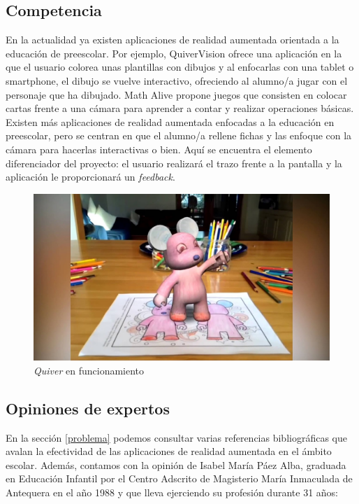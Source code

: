 \documentclass[12pt,spanish]{article}
\begin{document}
\subsection{Competencia}

En la actualidad ya existen aplicaciones de realidad aumentada orientada a la educación de preescolar. Por ejemplo, QuiverVision \cite{quiver} ofrece una aplicación en la que el usuario colorea unas plantillas con dibujos y al enfocarlas con una tablet o smartphone, el dibujo se vuelve interactivo, ofreciendo al alumno/a jugar con el personaje que ha dibujado. Math Alive \cite{MathAlive} propone juegos que consisten en colocar cartas frente a una cámara para aprender a contar y realizar operaciones básicas.\\

Existen más aplicaciones de realidad aumentada enfocadas a la educación en preescolar, pero se centran en que el alumno/a rellene fichas y las enfoque con la cámara para hacerlas interactivas o bien. Aquí se encuentra el elemento diferenciador del proyecto: el usuario realizará el trazo frente a la pantalla y la aplicación le proporcionará un \emph{feedback}.

\begin{figure}[H]
	\centering
	\includegraphics[scale=0.25]{quiver.jpg}
	\caption{\emph{Quiver} en funcionamiento}
\end{figure}

\subsection{Opiniones de expertos}

En la sección \ref{problema} podemos consultar varias referencias bibliográficas que avalan la efectividad de las aplicaciones de realidad aumentada en el ámbito escolar. Además, contamos con la opinión de Isabel María Páez Alba, graduada en Educación Infantil por el Centro Adscrito de Magisterio María Inmaculada de Antequera en el año 1988 y que lleva ejerciendo su profesión durante 31 años:
\end{document}

